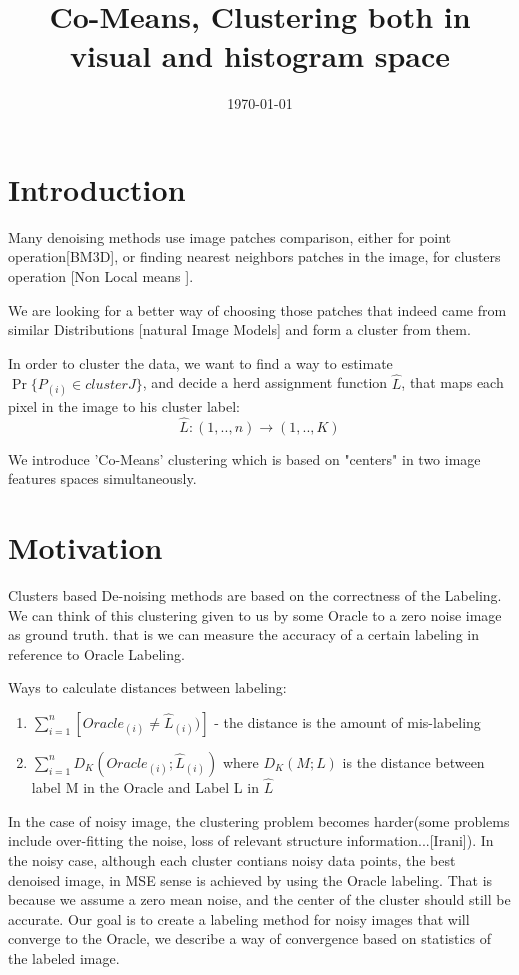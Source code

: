 \documentclass{article}
\title{Co-Means, Clustering both in visual and histogram space}
\author{}
\date{\today}
\begin{document}
\maketitle

\section{Introduction}
Many denoising methods use image patches comparison, either for point operation[BM3D], or finding nearest neighbors patches in the image, for clusters operation [Non Local means ].

We are looking for a better way of choosing those patches that indeed came from similar Distributions [natural Image Models] and form a cluster from them.

In order to cluster the data, we want to find a way to estimate $ \Pr\{P_{(i)}\in cluster J \}$, and decide a herd assignment function $ \hat{L} $, that maps each pixel in the image to his cluster label:
\begin{equation}
\hat L :(1,..,n)\rightarrow (1,..,K)
\end{equation}

We introduce 'Co-Means' clustering which is based on "centers" in two image features spaces simultaneously.


\section{Motivation}
Clusters based De-noising methods are based on the correctness of the Labeling.
We can think of this clustering given to us by some Oracle to a zero noise image as ground truth. that is we can measure the accuracy of a certain labeling in reference to Oracle Labeling.

Ways to calculate distances between labeling:
\begin{enumerate}
	\item $ \sum_{i=1}^{n} [Oracle_{(i)}\ne\hat{L}_{(i)})]$  - the distance is the amount of mis-labeling
	\item $ \sum_{i=1}^{n} D_K(Oracle_{(i)};\hat{L}_{(i)}) $ where $ D_K(M;L) $ is the distance between label M in the Oracle and Label L in $ \hat{L} $
\end{enumerate}

In the case of noisy image, the clustering problem becomes harder(some problems include over-fitting the noise, loss of relevant structure information...[Irani]). In the noisy case, although each cluster contians noisy data points, the best denoised image, in MSE sense is achieved by using the Oracle labeling. That is because we assume a zero mean noise, and the center of the cluster should still be accurate.
Our goal is to create a labeling method for noisy images that will converge to the Oracle, we describe a way of convergence based on statistics of the labeled image.
\end{document}
